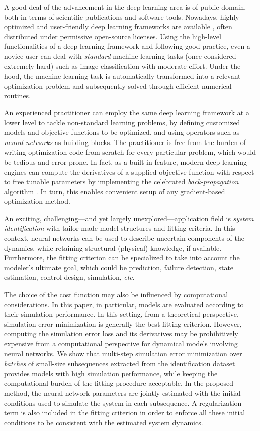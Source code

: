 \documentclass{article}
\begin{document}
A good deal of the advancement in the deep learning area is of public domain, both in terms of scientific publications and software tools.
 Nowadays, highly optimized and user-friendly deep learning frameworks are available \citep{paszke:2017automatic}, often distributed under permissive open-source licenses.
Using the high-level functionalities of a deep learning framework and following good practice, even a novice user can deal with  \emph{standard}  machine learning tasks (once considered extremely hard) such as image classification with moderate effort. Under the hood, the
machine learning task is automatically transformed into a relevant optimization problem and subsequently solved through efficient numerical routines.
 
 
 An experienced practitioner can employ the same deep learning framework at a lower level to tackle non-standard learning problems, by defining customized models and objective functions to be optimized, and using operators such as \emph{neural networks} as building blocks. 
The practitioner is free from the burden of writing optimization code from scratch for every particular problem, which would be tedious and error-prone.
In fact, as a built-in feature, modern deep learning engines can compute the derivatives of a supplied objective function with respect to free tunable parameters by implementing the celebrated \emph{back-propagation} algorithm \citep{rumelhart1988learning}. In turn, this enables convenient setup of any gradient-based optimization method.

An exciting, challenging---and yet largely unexplored---application field is \emph{system identification} with tailor-made model structures and fitting criteria. In this context, neural networks can be used to describe uncertain components of the  dynamics, while retaining structural (physical) knowledge, if available. Furthermore, the fitting criterion can be specialized to take into account the modeler's ultimate goal, which could be prediction, failure detection, state estimation, control design, simulation, \emph{etc}.  

The choice of the cost function may also be influenced by computational considerations. 
In this paper, in particular, models are evaluated according to their simulation performance. In this setting, from a theoretical perspective, simulation error minimization is generally the best fitting criterion. However, computing the simulation error loss and its derivatives may be prohibitively expensive from a computational perspective for   dynamical models involving neural networks.  
We  show that multi-step simulation error minimization over \emph{batches} of small-size subsequences extracted from the identification dataset provides models with high simulation performance, while keeping the computational burden of the fitting procedure acceptable. In the proposed method, the neural network parameters are jointly  estimated  with  the  initial conditions used to simulate the system in each subsequence.  
A regularization term is also included in the fitting criterion in order to enforce all these initial conditions to be consistent with the estimated system dynamics.  
 
\end{document}
